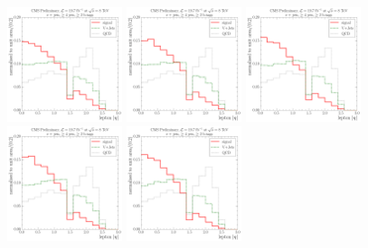 \begin{figure}[!htbp]
  \centering
    {\includegraphics[width=0.3\textwidth]{measurement/ST/central/fit_templates/electron_templates_bin_0-350}}
    {\includegraphics[width=0.3\textwidth]{measurement/ST/central/fit_templates/electron_templates_bin_350-400}}
    {\includegraphics[width=0.3\textwidth]{measurement/ST/central/fit_templates/electron_templates_bin_400-450}}\\
    {\includegraphics[width=0.3\textwidth]{measurement/ST/central/fit_templates/electron_templates_bin_450-500}}
    {\includegraphics[width=0.3\textwidth]{measurement/ST/central/fit_templates/electron_templates_bin_500-580}}

\end{figure}

